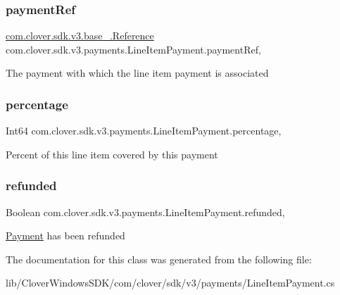 \subsubsection{\texorpdfstring{payment\+Ref}{paymentRef}}
{\footnotesize\ttfamily \hyperlink{classcom_1_1clover_1_1sdk_1_1v3_1_1base___1_1_reference}{com.\+clover.\+sdk.\+v3.\+base\+\_\+.\+Reference} com.\+clover.\+sdk.\+v3.\+payments.\+Line\+Item\+Payment.\+payment\+Ref\hspace{0.3cm}{\ttfamily [get]}, {\ttfamily [set]}}



The payment with which the line item payment is associated 

\mbox{\label{classcom_1_1clover_1_1sdk_1_1v3_1_1payments_1_1_line_item_payment_afa610c11c1fb3a87628f4f74d98e864e}} 
\subsubsection{\texorpdfstring{percentage}{percentage}}
{\footnotesize\ttfamily Int64 com.\+clover.\+sdk.\+v3.\+payments.\+Line\+Item\+Payment.\+percentage\hspace{0.3cm}{\ttfamily [get]}, {\ttfamily [set]}}



Percent of this line item covered by this payment 

\mbox{\label{classcom_1_1clover_1_1sdk_1_1v3_1_1payments_1_1_line_item_payment_af51ba6631bf7e29f9379566a7bf840b5}} 
\subsubsection{\texorpdfstring{refunded}{refunded}}
{\footnotesize\ttfamily Boolean com.\+clover.\+sdk.\+v3.\+payments.\+Line\+Item\+Payment.\+refunded\hspace{0.3cm}{\ttfamily [get]}, {\ttfamily [set]}}



\hyperlink{classcom_1_1clover_1_1sdk_1_1v3_1_1payments_1_1_payment}{Payment} has been refunded 



The documentation for this class was generated from the following file\+:\begin{DoxyCompactItemize}
\item 
lib/\+Clover\+Windows\+S\+D\+K/com/clover/sdk/v3/payments/Line\+Item\+Payment.\+cs\end{DoxyCompactItemize}
